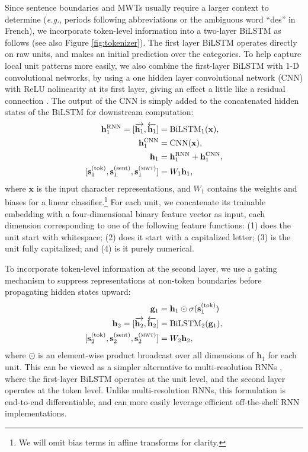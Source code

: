 \documentclass[11pt,a4paper]{article}
\begin{document}
Since sentence boundaries and MWTs usually require a larger context to determine (\emph{e.g.}, periods following abbreviations or the ambiguous word ``des'' in French), we incorporate token-level information into a two-layer BiLSTM as follows (see also Figure \ref{fig:tokenizer}). The first layer BiLSTM operates directly on raw units, and makes an initial prediction over the categories.
To help capture local unit patterns more easily, we also combine the first-layer BiLSTM with 1-D convolutional networks, by using a one hidden layer convolutional network (CNN) with ReLU nolinearity at its first layer, giving an effect a little like a residual connection \cite{he2016residual}.
The output of the CNN is simply added to the concatenated hidden states of the BiLSTM for downstream computation:
\begin{align}
\mathbf{h}^{\text{RNN}}_1 = [\overrightarrow{\mathbf{h}_1}, \overleftarrow{\mathbf{h}_1}] &= \text{BiLSTM}_1(\mathbf{x}),\\
\mathbf{h}^{\text{CNN}}_1 &= \text{CNN}(\mathbf{x}),\\
\mathbf{h}_1 &= \mathbf{h}_1^{\text{RNN}} + \mathbf{h}_1^{\text{CNN}}, \\
[\mathbf{s}^{(\text{tok})}_1, \mathbf{s}^{(\text{sent})}_1, \mathbf{s}^{(\textsc{mwt})}_1] &= W_1\mathbf{h}_1,
\end{align}
where $\mathbf{x}$ is the input character representations, and $W_1$ contains the weights and biases for a linear classifier.\footnote{We will omit bias terms in affine transforms for clarity.}
For each unit, we concatenate its trainable embedding with a four-dimensional binary feature vector as input, each dimension corresponding to one of the following feature functions: (1) does the unit start with whitespace; (2) does it start with a capitalized letter; (3) is the unit fully capitalized; and (4) is it purely numerical.

To incorporate token-level information at the second layer, we use a gating mechanism to suppress representations at non-token boundaries before propagating hidden states upward:
\begin{align}
\mathbf{g}_1 &=\mathbf{h}_1 \odot \sigma(\mathbf{s}^{(\text{tok})}_1) \\\label{eqn:tokenizer_gating}
\mathbf{h}_2 = [\overrightarrow{\mathbf{h}_2}, \overleftarrow{\mathbf{h}_2}] &= \text{BiLSTM}_2(\mathbf{g}_1), \\
[\mathbf{s}^{(\text{tok})}_2, \mathbf{s}^{(\text{sent})}_2, \mathbf{s}^{(\textsc{mwt})}_2] &= W_2\mathbf{h}_2,
\end{align}
where $\odot$ is an element-wise product broadcast over all dimensions of $\mathbf{h}_1$ for each unit. This can be viewed as a simpler alternative to multi-resolution RNNs \cite{serban2017multiresolution}, where the first-layer BiLSTM operates at the unit level, and the second layer operates at the token level. Unlike multi-resolution RNNs, this formulation is end-to-end differentiable, and can more easily leverage efficient off-the-shelf RNN implementations.
\end{document}
